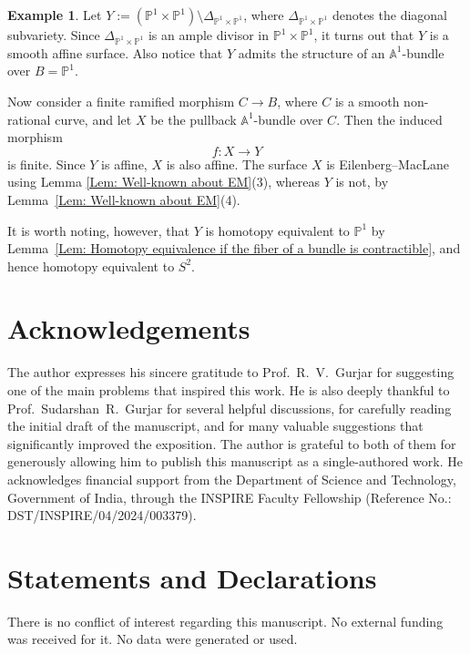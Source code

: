 \documentclass[12pt,reqno,twoside]{amsart}
\theoremstyle{definition}
\newtheorem{example}[theorem]{Example}
\numberwithin{equation}{section}
\newcommand{\A}{\mathbb{A}}
\newcommand{\PP}{\mathbb{P}}
\begin{document}
\begin{example}\label{Ex: Non-example to the main question}
	Let $Y := (\PP^1 \times \PP^1) \setminus \Delta_{\PP^1 \times \PP^1}$, where $\Delta_{\PP^1 \times \PP^1}$ denotes the diagonal subvariety. Since $\Delta_{\PP^1 \times \PP^1}$ is an ample divisor in $\PP^1 \times \PP^1$, it turns out that $Y$ is a smooth affine surface. Also notice that $Y$ admits the structure of an $\A^1$-bundle over $B = \PP^1$. 
	
	Now consider a finite ramified morphism $C \to B$, where $C$ is a smooth non-rational curve, and let $X$ be the pullback $\A^1$-bundle over $C$. Then the induced morphism 
	\[
	f \colon X \longrightarrow Y
	\]
	is finite. Since $Y$ is affine, $X$ is also affine. The surface $X$ is Eilenberg–MacLane using Lemma \ref{Lem: Well-known about EM}(3), whereas $Y$ is not, by Lemma~\ref{Lem: Well-known about EM}(4).
	
	It is worth noting, however, that $Y$ is homotopy equivalent to $\PP^1$ by Lemma~\ref{Lem: Homotopy equivalence if the fiber of a bundle is contractible}, and hence homotopy equivalent to $S^2$.
\end{example}

\section*{\bf Acknowledgements} 

The author expresses his sincere gratitude to Prof.~R.~V.~Gurjar for suggesting one of the main problems that inspired this work. He is also deeply thankful to Prof.~Sudarshan~R.~Gurjar for several helpful discussions, for carefully reading the initial draft of the manuscript, and for many valuable suggestions that significantly improved the exposition. The author is grateful to both of them for generously allowing him to publish this manuscript as a single-authored work. He acknowledges financial support from the Department of Science and Technology, Government of India, through the INSPIRE Faculty Fellowship (Reference No.: DST/INSPIRE/04/2024/003379).


\section*{\bf Statements and Declarations}

There is no conflict of interest regarding this manuscript. No external funding was received for it. No data were generated or used.




\end{document}
